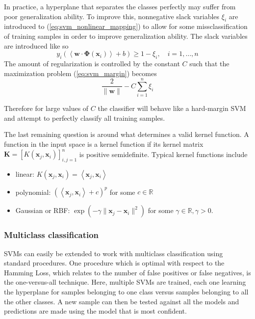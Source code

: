 In practice, a hyperplane that separates the classes perfectly may suffer from
poor generalization ability. To improve this, nonnegative slack variables
$\xi_i$ are introduced to (\ref{eq:svm_nonlinear_mapping}) to allow for some
missclassification of training samples in order to improve generalization
ability. The slack variables are introduced like so
\begin{equation}\label{eq:svm_nonlinear_mapping_slack}
y_i\left( \left< \mathbf{w} \cdot \boldsymbol{\Phi}(\mathbf{x}_i) \right> + b
\right) \ge 1 - \xi_i, \hspace{1em}
i = 1,\ldots,n
\end{equation}
The amount of regularization is controlled by the constant $C$ such that the
maximization problem (\ref{eq:svm_margin}) becomes
\begin{equation}
\frac{2}{\|\mathbf{w}\|} - C \sum_{i=1}^{n} \xi_i
\end{equation}

Therefore for large values of $C$ the classifier will behave like a hard-margin
SVM and attempt to perfectly classify all training samples.

The last remaining question is around what determines a valid kernel function. A
function in the input space is a kernel function if its kernel matrix
$\mathbf{K} = \left[ K(\mathbf{x}_j,\mathbf{x}_i) \right]^{n}_{i,j=1}$ is
positive semidefinite. Typical kernel functions include
\begin{itemize}

  \item linear: $K(\mathbf{x}_j,\mathbf{x}_i) = \left< \mathbf{x}_j, \mathbf{x}_i \right>$

  \item polynomial: $\left(\left< \mathbf{x}_j, \mathbf{x}_i \right> + c\right)^p$
    for some $c \in \mathbb{R}$

  \item Gaussian or RBF\@: $\exp \left( -\gamma \|\mathbf{x}_j-\mathbf{x}_i\|^2 \right)$
    for some $\gamma \in \mathbb{R}, \gamma > 0$.

\end{itemize}

\subsubsection{Multiclass classification}

SVMs can easily be extended to work with multiclass classification using
standard procedures. One procedure which is optimal with respect to the Hamming
Loss, which relates to the number of false positives or false negatives, is the
one-versus-all technique. Here, multiple SVMs are trained, each one learning the
hyperplane for samples belonging to one class versus samples belonging to all
the other classes. A new sample can then be tested against all the models and
predictions are made using the model that is most confident.

